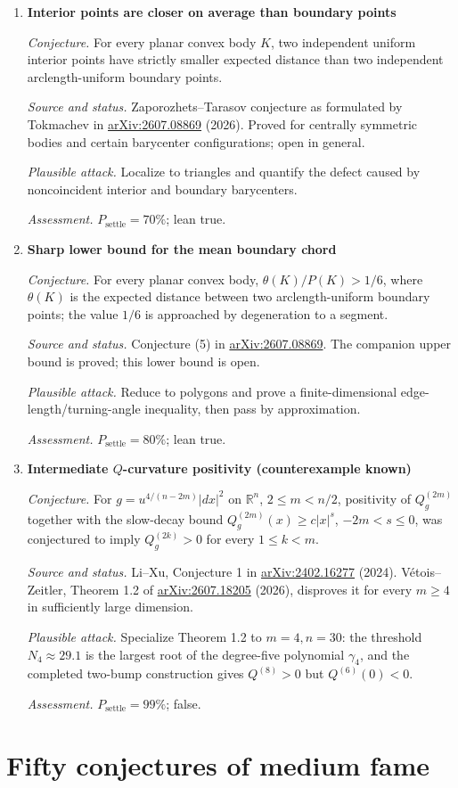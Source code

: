 \documentclass[11pt]{article}
\newcommand{\cand}[5]{%
  \item \textbf{#1}\par
  \emph{Conjecture.} #2\par
  \emph{Source and status.} #3\par
  \emph{Plausible attack.} #4\par
  \emph{Assessment.} #5
}
\newcommand{\psettle}{P_{\mathrm{settle}}}
\begin{document}
\begin{enumerate}[label=\textbf{L\arabic*.}]
\cand{Interior points are closer on average than boundary points}
{For every planar convex body $K$, two independent uniform interior points have strictly smaller expected distance than two independent arclength-uniform boundary points.}
{Zaporozhets--Tarasov conjecture as formulated by Tokmachev in \href{https://arxiv.org/abs/2607.08869}{arXiv:2607.08869} (2026).  Proved for centrally symmetric bodies and certain barycenter configurations; open in general.}
{Localize to triangles and quantify the defect caused by noncoincident interior and boundary barycenters.}
{$\psettle=70\%$; lean true.}

\cand{Sharp lower bound for the mean boundary chord}
{For every planar convex body, $\theta(K)/P(K)>1/6$, where $\theta(K)$ is the expected distance between two arclength-uniform boundary points; the value $1/6$ is approached by degeneration to a segment.}
{Conjecture (5) in \href{https://arxiv.org/abs/2607.08869}{arXiv:2607.08869}.  The companion upper bound is proved; this lower bound is open.}
{Reduce to polygons and prove a finite-dimensional edge-length/turning-angle inequality, then pass by approximation.}
{$\psettle=80\%$; lean true.}

\cand{Intermediate $Q$-curvature positivity (counterexample known)}
{For $g=u^{4/(n-2m)}|dx|^2$ on $\mathbb R^n$, $2\le m<n/2$, positivity of $Q_g^{(2m)}$ together with the slow-decay bound $Q_g^{(2m)}(x)\ge c|x|^s$, $-2m<s\le0$, was conjectured to imply $Q_g^{(2k)}>0$ for every $1\le k<m$.}
{Li--Xu, Conjecture 1 in \href{https://arxiv.org/abs/2402.16277}{arXiv:2402.16277} (2024).  V\'etois--Zeitler, Theorem 1.2 of \href{https://arxiv.org/abs/2607.18205}{arXiv:2607.18205} (2026), disproves it for every $m\ge4$ in sufficiently large dimension.}
{Specialize Theorem 1.2 to $m=4,n=30$: the threshold $N_4\approx29.1$ is the largest root of the degree-five polynomial $\gamma_4$, and the completed two-bump construction gives $Q^{(8)}>0$ but $Q^{(6)}(0)<0$.}
{$\psettle=99\%$; false.}

\end{enumerate}

\section{Fifty conjectures of medium fame}
\end{document}
